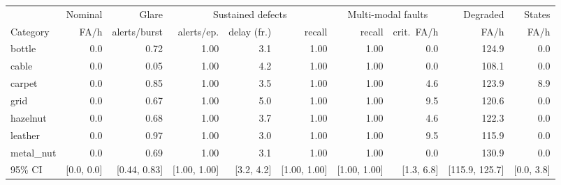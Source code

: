 \begin{tabular}{@{}lrrrrrrrrr@{}}
\toprule
 & Nominal & Glare & \multicolumn{3}{c}{Sustained defects} & \multicolumn{2}{c}{Multi-modal faults} & Degraded & States \\
\cmidrule(lr){4-6}\cmidrule(lr){7-8}
Category & FA/h & alerts/burst & alerts/ep. & delay (fr.) & recall & recall & crit.\ FA/h & FA/h & FA/h \\
\midrule
bottle & 0.0 & 0.72 & 1.00 & 3.1 & 1.00 & 1.00 & 0.0 & 124.9 & 0.0 \\
cable & 0.0 & 0.05 & 1.00 & 4.2 & 1.00 & 1.00 & 0.0 & 108.1 & 0.0 \\
carpet & 0.0 & 0.85 & 1.00 & 3.5 & 1.00 & 1.00 & 4.6 & 123.9 & 8.9 \\
grid & 0.0 & 0.67 & 1.00 & 5.0 & 1.00 & 1.00 & 9.5 & 120.6 & 0.0 \\
hazelnut & 0.0 & 0.68 & 1.00 & 3.7 & 1.00 & 1.00 & 4.6 & 122.3 & 0.0 \\
leather & 0.0 & 0.97 & 1.00 & 3.0 & 1.00 & 1.00 & 9.5 & 115.9 & 0.0 \\
metal\_nut & 0.0 & 0.69 & 1.00 & 3.1 & 1.00 & 1.00 & 0.0 & 130.9 & 0.0 \\
\midrule
95\% CI & [0.0, 0.0] & [0.44, 0.83] & [1.00, 1.00] & [3.2, 4.2] & [1.00, 1.00] & [1.00, 1.00] & [1.3, 6.8] & [115.9, 125.7] & [0.0, 3.8] \\
\bottomrule
\end{tabular}

